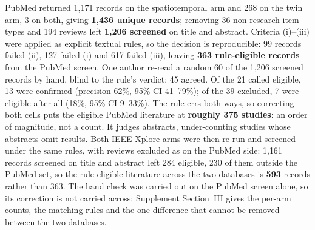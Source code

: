 \documentclass[journal]{IEEEtran}
\begin{document}
PubMed returned 1{,}171 records on the spatiotemporal arm and 268 on the twin arm, 3 on both, giving \textbf{1{,}436 unique records}; removing 36 non-research item types and 194 reviews left \textbf{1{,}206 screened} on title and abstract. Criteria (i)--(iii) were applied as explicit textual rules, so the decision is reproducible: 99 records failed (ii), 127 failed (i) and 617 failed (iii), leaving \textbf{363 rule-eligible records} from the PubMed screen. One author re-read a random 60 of the 1{,}206 screened records by hand, blind to the rule's verdict: 45 agreed. Of the 21 called eligible, 13 were confirmed (precision 62\%, 95\% CI 41--79\%); of the 39 excluded, 7 were eligible after all (18\%, 95\% CI 9--33\%). The rule errs both ways, so correcting both cells puts the eligible PubMed literature at \textbf{roughly 375 studies}: an order of magnitude, not a count. It judges abstracts, under-counting studies whose abstracts omit results. Both IEEE Xplore arms were then re-run and screened under the same rules, with reviews excluded as on the PubMed side: 1{,}161 records screened on title and abstract left 284 eligible, 230 of them outside the PubMed set, so the rule-eligible literature across the two databases is \textbf{593} records rather than 363. The hand check was carried out on the PubMed screen alone, so its correction is not carried across; Supplement Section~III gives the per-arm counts, the matching rules and the one difference that cannot be removed between the two databases.
\end{document}
